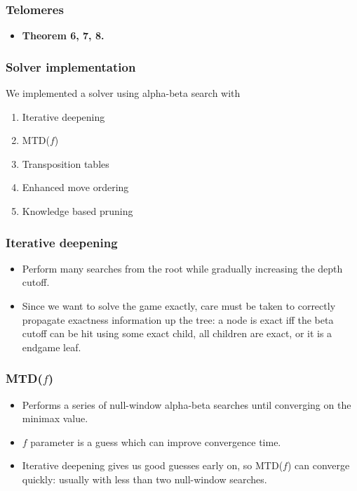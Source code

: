 \documentclass{beamer}
\begin{document}
    \begin{frame}
        \frametitle{Telomeres}
        \begin{itemize}
            \item \textbf{Theorem 6, 7, 8.}
        \end{itemize}
    \end{frame}

    \begin{frame}
        \frametitle{Solver implementation}
        We implemented a solver using alpha-beta search with
        \begin{enumerate}
            \item Iterative deepening
            \item MTD($f$)
            \item Transposition tables
            \item Enhanced move ordering
            \item Knowledge based pruning
        \end{enumerate}
    \end{frame}

    \begin{frame}
        \frametitle{Iterative deepening}
        \begin{itemize}
            \item Perform many searches from the root while gradually increasing the depth cutoff.
            \item Since we want to solve the game exactly, care must be taken to correctly propagate exactness
                information up the tree: a node is exact iff the beta cutoff can be hit using some exact child,
                all children are exact, or it is a endgame leaf.
        \end{itemize}
    \end{frame}

    \begin{frame}
        \frametitle{MTD($f$)}
        \begin{itemize}
            \item Performs a series of null-window alpha-beta searches until converging on the minimax value.
            \item $f$ parameter is a guess which can improve convergence time.
            \item Iterative deepening gives us good guesses early on, so MTD($f$) can converge quickly:
                usually with less than two null-window searches.
        \end{itemize}
    \end{frame}
\end{document}
